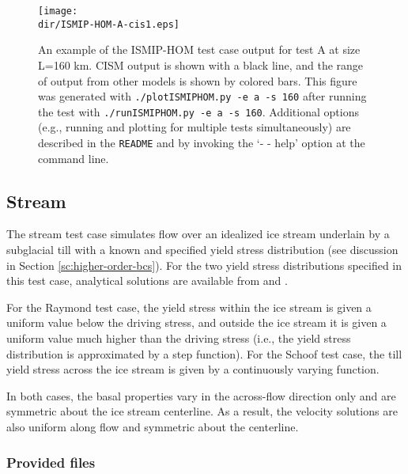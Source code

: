 \begin{figure}[H!]
	\centering
	\texttt{[image: \\dir/ISMIP-HOM-A-cis1.eps]}
	\caption{An example of the ISMIP-HOM test case output for test A at size L=160 km. 
CISM output is shown with a black line, and the range of output from other models is shown by colored bars. 
This figure was generated with \texttt{./plotISMIPHOM.py -e a -s 160} after running the test with \texttt{./runISMIPHOM.py -e a -s 160}.
Additional options (e.g., running and plotting for multiple tests simultaneously) are described in the \texttt{README} and by invoking the
`- - help' option at the command line.}
	\label{fig:ismiphom-results}
\end{figure}
\FloatBarrier

\subsection{Stream}

The stream test case simulates flow over an idealized ice stream underlain by a subglacial till with a known and specified
yield stress distribution (see discussion in Section \ref{sc:higher-order-bcs}). For the two yield stress distributions specified in this test case, 
analytical solutions are available from \citet{Raymond2000} and \citet{Schoof2006}. 

For the Raymond test case, the yield stress within the ice stream is given a uniform value below the driving stress, and outside the
ice stream it is given a uniform value much higher than the driving stress (i.e., the yield stress distribution is approximated by a
step function). For the Schoof test case, the till yield stress across the ice stream is given by a continuously varying function.

In both cases, the basal properties vary in the across-flow direction only and are symmetric about the ice stream centerline.
As a result, the velocity solutions are also uniform along flow and symmetric about the centerline.

\subsubsection{Provided files}

